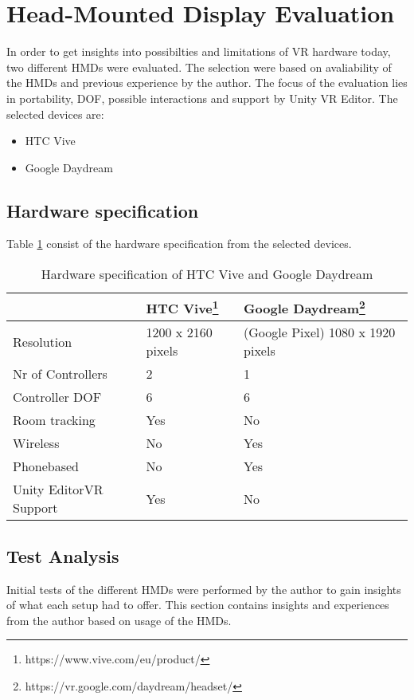 \section{Head-Mounted Display Evaluation}
\label{result:hardware}
In order to get insights into possibilties and limitations of VR hardware today, two different HMDs were evaluated. The selection were based on avaliability of the HMDs and previous experience by the author. The focus of the evaluation lies in portability, DOF, possible interactions and support by Unity VR Editor. The selected devices are:
\begin{itemize}
  \item HTC Vive
  \item Google Daydream
\end{itemize}
\subsection{Hardware specification}
Table \ref{table:result:hardware:spec} consist of the hardware specification from the selected devices.
\begin{table}[]
\centering
\caption{Hardware specification of HTC Vive and Google Daydream}
\label{table:result:hardware:spec}
\begin{tabular}{|l|l|l|}
  \hline
                       & \textbf{HTC Vive}\footnote{https://www.vive.com/eu/product/}  & \textbf{Google Daydream}\footnote{https://vr.google.com/daydream/headset/}          \\\hline
Resolution             & 1200 x 2160 pixels & (Google Pixel) 1080 x 1920 pixels \\\hline
Nr of Controllers      & 2                  & 1                                 \\\hline
Controller DOF         & 6                  & 6                                 \\\hline
Room tracking          & Yes                & No                                \\\hline
Wireless               & No                 & Yes                               \\\hline
Phonebased             & No                 & Yes                               \\\hline
Unity EditorVR Support & Yes                & No                                \\\hline
\end{tabular}
\end{table}
\subsection{Test Analysis}
Initial tests of the different HMDs were performed by the author to gain insights of what each setup had to offer. This section contains insights and experiences from the author based on usage of the HMDs.
